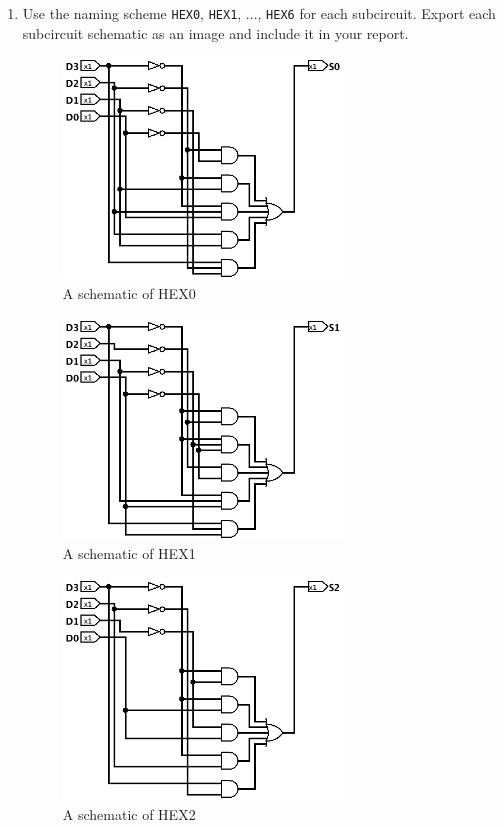 \documentclass{article}
\begin{document}
\begin{enumerate}
\item Use the naming scheme \verb|HEX0|, \verb|HEX1|, ..., \verb|HEX6| for each subcircuit.
    Export each subcircuit schematic as an image and include it in your report.

\begin{figure}[ht!]
    \centering
    \includegraphics[width=0.7\textwidth]{part2_hex0.png}
    \caption{A schematic of HEX0}
    \label{f:part2_hex0}
\end{figure}

\begin{figure}[ht!]
    \centering
    \includegraphics[width=0.7\textwidth]{part2_hex1.png}
    \caption{A schematic of HEX1}
    \label{f:part2_hex1}
\end{figure}

\begin{figure}[ht!]
    \centering
    \includegraphics[width=0.7\textwidth]{part2_hex2.png}
    \caption{A schematic of HEX2}
    \label{f:part2_hex2}
\end{figure}



\end{enumerate}
\end{document}

